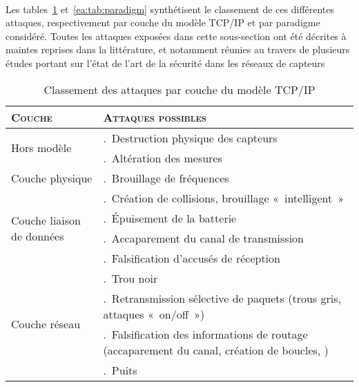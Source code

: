         \paragraph{}
Les tables~\ref{ea:tab:layer} et~\ref{ea:tab:paradigm} synthétisent le classement de ces différentes attaques, respectivement par couche du modèle TCP/IP et par paradigme considéré.
Toutes les attaques exposées dans cette sous-section ont été décrites à maintes reprises dans la littérature, et notamment réunies au travers de plusieurs études portant sur l'état de l'art de la sécurité dans les réseaux de capteurs~\cite{SSS11,RM11,AD14}
\begin{table}[!ht]
    \setcounter{LayerNumber}{1}
    \newcommand\num[1]{\theLayerNumber.~#1\stepcounter{LayerNumber}}
    \caption{Classement des attaques par couche du modèle TCP/IP}\label{ea:tab:layer}
    \centering
    \medskip
    \begin{small}
        \begin{tabular}{m{}|p{}}
            \toprule
            \textsc{Couche} & \textsc{Attaques possibles}\\
            \midrule
            \multirow{2}{*}{Hors modèle}%
                & \num{Destruction physique des capteurs}\\
                & \num{Altération des mesures}\\
            \midrule
            \multirow{1}{*}{Couche physique}%
                & \num{Brouillage de fréquences}\\
            \midrule
            \multirow{4}{*}{\parbox{.2\textwidth}{Couche liaison de données}}%
                & \num{Création de collisions, brouillage « intelligent »}\\
                & \num{Épuisement de la batterie}\\
                & \num{Accaparement du canal de transmission}\\
                & \num{Falsification d'accusés de réception}\\
            \midrule
            \multirow{8}{*}{Couche réseau}%
                & \num{Trou noir}\\
                & \num{Retransmission sélective de paquets (trous gris, attaques « on/off »)}\\
                & \num{Falsification des informations de routage (accaparement du canal, création de boucles, \etc)}\\
                & \num{Puits}\\

\end{tabular}
\end{small}
\end{table}
